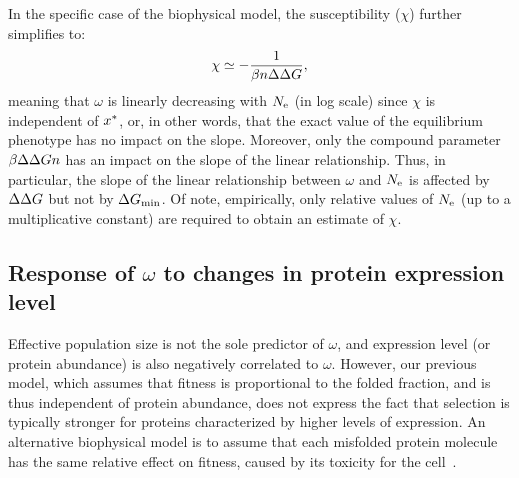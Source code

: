 \documentclass[authoryear]{elsarticle} %
\providecommand{\DIFaddtex}[1]{{\protect\color{blue}\uwave{#1}}} %
\providecommand{\DIFdeltex}[1]{{\protect\color{red}\sout{#1}}}                      %
\providecommand{\DIFaddbegin}{} %
\providecommand{\DIFaddend}{} %
\providecommand{\DIFdelbegin}{} %
\providecommand{\DIFdelend}{} %
\providecommand{\DIFadd}[1]{\texorpdfstring{\DIFaddtex{#1}}{#1}} %
\providecommand{\DIFdel}[1]{\texorpdfstring{\DIFdeltex{#1}}{}} %
\begin{document}
In the specific case of the biophysical model, the susceptibility ($\chi$) further simplifies to:
\begin{gather}
    \chi \simeq -\dfrac{1}{\beta n \Delta \Delta G}, \label{eq:chi_application}
\end{gather}
meaning that $\omega$ is linearly decreasing with $N_{\text{e}}$ (in log scale) since $\chi$ is independent of $x^{*}$, or, in other words, that the exact value of the equilibrium {phenotype} has no impact on the slope.
Moreover, only the compound parameter \DIFdelbegin \DIFdel{$\beta \Delta \Delta G n$ }\DIFdelend \DIFaddbegin \DIFadd{$\beta \NbrSites \EmpiricalDeltaDeltaG$ }\DIFaddend has an impact on the slope of the linear relationship.
Thus, in particular, the slope of the linear relationship between $\omega$ and $N_{\text{e}}$ is affected by $\Delta \Delta G$ but not by $\Delta G_{\text{min}}$.
Of note, empirically, only relative values of $N_{\text{e}}$ (up to a multiplicative constant) are required to obtain an estimate of $\chi$.

\subsection{Response of $\omega$ to changes in protein expression level}
\label{sec:expression}

Effective population size is not the sole predictor of $\omega$, and expression level (or protein abundance) is also negatively correlated to $\omega$.
However, our previous model, which assumes that fitness is proportional to the folded fraction, and is thus independent of protein abundance, does not express the fact that selection is typically stronger for proteins characterized by higher levels of expression.
An alternative biophysical model is to assume that each misfolded protein molecule has the same relative effect on fitness, caused by its toxicity for the cell~\citep{Drummond2005a, Wilke2006, Drummond2008, Serohijos2012}.
\end{document}
